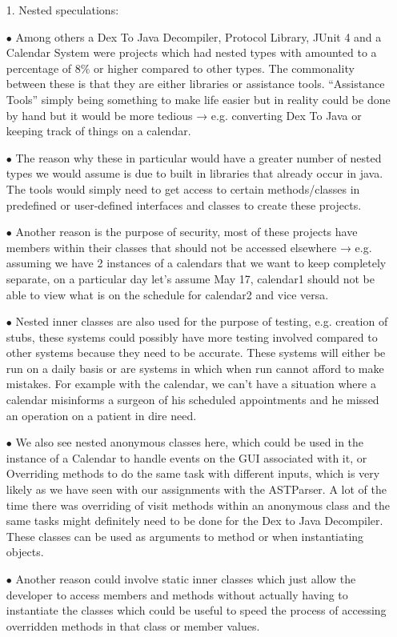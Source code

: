 \documentclass{assignment}
\begin{document}
\begin{enumerate}

\item[1.] Nested speculations:\\
\item[$\bullet$]	Among others a Dex To Java Decompiler, Protocol Library, JUnit 4 and a Calendar System were projects which had nested types with amounted to a percentage of 8$\%$ or higher compared to other types. The commonality between these is that they are either libraries or assistance tools. “Assistance Tools” simply being something to make life easier but in reality could be done by hand but it would be more tedious → e.g. converting Dex To Java or keeping track of things on a calendar. \\
\item[$\bullet$]	The reason why these in particular would have a greater number of nested types we would assume is due to built in libraries that already occur in java. The tools would simply need to get access to certain methods/classes in predefined or user-defined interfaces and classes to create these projects.
\item[$\bullet$]Another reason is the purpose of security, most of these projects have members within their classes that should not be accessed elsewhere → e.g. assuming we have 2 instances of a calendars that we want to keep completely separate, on a particular day let’s assume May 17, calendar1 should not be able to view what is on the schedule for calendar2 and vice versa.\\
\item[$\bullet$]Nested inner classes are also used for the purpose of testing,  e.g. creation of stubs, these systems could possibly have more testing involved compared to other systems because they need to be accurate. These systems will either be run on a daily basis or are systems in which when run cannot afford to make mistakes. For example with the calendar, we can’t have a situation where a calendar misinforms a surgeon of his scheduled appointments and he missed an operation on a patient in dire need.\\
\item[$\bullet$]We also see nested anonymous classes here, which could be used in the instance of a Calendar to handle events on the GUI associated with it, or Overriding methods to do the same task with different inputs, which is very likely as we have seen with our assignments with the ASTParser. A lot of the time there was overriding of visit methods within an anonymous class and the same tasks might definitely need to be done for the Dex to Java Decompiler. These classes can be used as arguments to method or when instantiating objects.\\
\item[$\bullet$]Another reason could involve static inner classes which just allow the developer to access members and methods without actually having to instantiate the classes which could be useful to speed the process of accessing overridden methods in that class or member values.


\end{enumerate}
\end{document}
